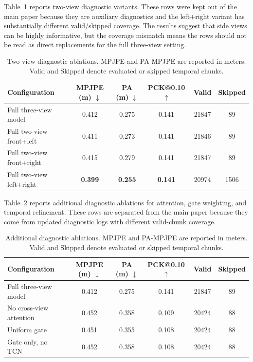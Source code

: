 \documentclass[runningheads]{llncs}
\begin{document}
Table~\ref{tab:supp_twoview} reports two-view diagnostic variants. These rows were kept out of the main paper because they are auxiliary diagnostics and the left+right variant has substantially different valid/skipped coverage. The results suggest that side views can be highly informative, but the coverage mismatch means the rows should not be read as direct replacements for the full three-view setting.

\begin{table}[H]
\centering
\caption{Two-view diagnostic ablations. MPJPE and PA-MPJPE are reported in meters. Valid and Skipped denote evaluated or skipped temporal chunks.}
\label{tab:supp_twoview}
\scriptsize
\setlength{\tabcolsep}{3pt}
\begin{tabular}{lccccc}
\hline
Configuration & MPJPE (m) $\downarrow$ & PA (m) $\downarrow$ & PCK@0.10 $\uparrow$ & Valid & Skipped \\
\hline
Full three-view model & 0.412 & 0.275 & 0.141 & 21847 & 89 \\
Full two-view front+left & 0.411 & 0.273 & 0.141 & 21846 & 89 \\
Full two-view front+right & 0.415 & 0.279 & 0.141 & 21847 & 89 \\
Full two-view left+right & \textbf{0.399} & \textbf{0.255} & \textbf{0.141} & 20974 & 1506 \\
\hline
\end{tabular}
\end{table}

Table~\ref{tab:supp_diagnostic_ablation} reports additional diagnostic ablations for attention, gate weighting, and temporal refinement. These rows are separated from the main paper because they come from updated diagnostic logs with different valid-chunk coverage.

\begin{table}[H]
\centering
\caption{Additional diagnostic ablations. MPJPE and PA-MPJPE are reported in meters. Valid and Skipped denote evaluated or skipped temporal chunks.}
\label{tab:supp_diagnostic_ablation}
\scriptsize
\setlength{\tabcolsep}{3pt}
\begin{tabular}{lccccc}
\hline
Configuration & MPJPE (m) $\downarrow$ & PA (m) $\downarrow$ & PCK@0.10 $\uparrow$ & Valid & Skipped \\
\hline
Full three-view model & 0.412 & 0.275 & 0.141 & 21847 & 89 \\
No cross-view attention & 0.452 & 0.358 & 0.109 & 20424 & 88 \\
Uniform gate & 0.451 & 0.355 & 0.108 & 20424 & 88 \\
Gate only, no TCN & 0.452 & 0.358 & 0.108 & 20424 & 88 \\
\hline
\end{tabular}
\end{table}
\end{document}
